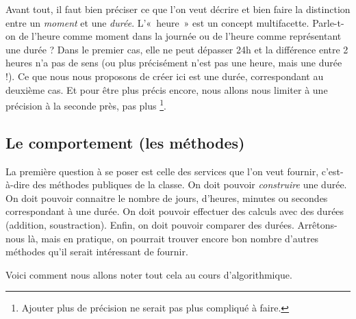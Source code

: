 		Avant tout, il faut bien préciser ce que l’on veut décrire
		et bien faire la distinction entre un \emph{moment} et une \emph{durée}.
		L’«~heure~» est un concept multifacette. 
		Parle-t-on de l’heure comme moment dans la journée 
		ou de l’heure comme représentant une durée ? 
		Dans le premier cas, elle ne peut dépasser 24h 
		et la différence entre 2 heures n’a pas de sens 
		(ou plus précisément n’est pas une heure, mais une durée !).
		Ce que nous nous proposons de créer ici est une durée,
		correspondant au deuxième cas.
		Et pour être plus précis encore,
		nous allons nous limiter à une précision à la seconde près,
		pas plus%
		\footnote{%
			Ajouter plus de précision ne serait pas plus compliqué à faire.%
		}.

\newpage 

	\subsection{Le comportement (les méthodes)}
	
		La première question à se poser est celle des services que l’on veut
		fournir, c’est-à-dire des méthodes publiques de la classe. On doit
		pouvoir \textit{construire} une durée. On doit pouvoir connaitre le
		nombre de jours, d’heures, minutes ou secondes correspondant à une durée. On doit
		pouvoir effectuer des calculs avec des durées (addition, soustraction).
		Enfin, on doit pouvoir comparer des durées. Arrêtons-nous là, mais en
		pratique, on pourrait trouver encore bon nombre d’autres méthodes qu’il
		serait intéressant de fournir. 
		
		Voici comment nous allons noter tout cela au cours d'algorithmique.
		
		\begin{algo}
		\end{algo}
		
